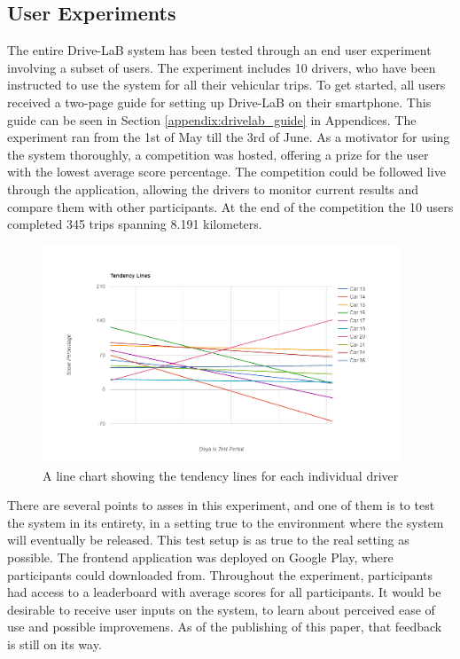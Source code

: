 \subsection{User Experiments}\label{subsec:userexp}

The entire Drive-LaB system has been tested through an end user experiment involving a subset of users. The experiment includes 10 drivers, who have been instructed to use the system for all their vehicular trips. To get started, all users received a two-page guide for setting up Drive-LaB on their smartphone. This guide can be seen in Section \ref{appendix:drivelab_guide} in Appendices. The experiment ran from the 1st of May till the 3rd of June. As a motivator for using the system thoroughly, a competition was hosted, offering a prize for the user with the lowest average score percentage. The competition could be followed live through the application, allowing the drivers to monitor current results and compare them with other participants. At the end of the competition the 10 users completed 345 trips spanning 8.191 kilometers.

\begin{figure}[tb]
\centering
\includegraphics[width=0.95\textwidth]{Pictures/tendenslinjer}
\caption{A line chart showing the tendency lines for each individual driver}
\label{fig:tendencylines}
\end{figure}

There are several points to asses in this experiment, and one of them is to test the system in its entirety, in a setting true to the environment where the system will eventually be released. This test setup is as true to the real setting as possible. The frontend application was deployed on Google Play, where participants could downloaded from. Throughout the experiment, participants had access to a leaderboard with average scores for all participants. 
It would be desirable to receive user inputs on the system, to learn about perceived ease of use and possible improvemens. As of the publishing of this paper, that feedback is still on its way.

